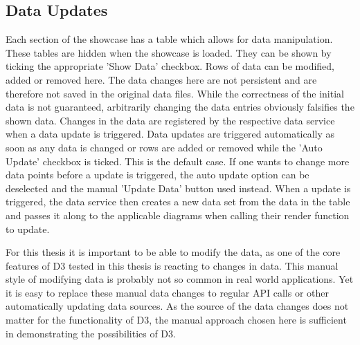 \subsection{Data Updates}

Each section of the showcase has a table which allows for data manipulation. These tables are hidden when the showcase is loaded. They can be shown by ticking the appropriate 'Show Data' checkbox. Rows of data can be modified, added or removed here. The data changes here are not persistent and are therefore not saved in the original data files. While the correctness of the initial data is not guaranteed, arbitrarily changing the data entries obviously falsifies the shown data. Changes in the data are registered by the respective data service when a data update is triggered. Data updates are triggered automatically as soon as any data is changed or rows are added or removed while the 'Auto Update' checkbox is ticked. This is the default case. If one wants to change more data points before a update is triggered, the auto update option can be deselected and the manual 'Update Data' button used instead. When a update is triggered, the data service then creates a new data set from the data in the table and passes it along to the applicable diagrams when calling their render function to update.

For this thesis it is important to be able to modify the data, as one of the core features of D3 tested in this thesis is reacting to changes in data. This manual style of modifying data is probably not so common in real world applications. Yet it is easy to replace these manual data changes to regular API calls or other automatically updating data sources. As the source of the data changes does not matter for the functionality of D3, the manual approach chosen here is sufficient in demonstrating the possibilities of D3.
